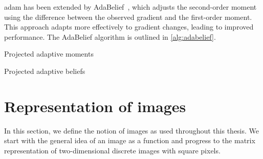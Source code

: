 \Gls{adam} has been extended by AdaBelief~\cite{zhuang2020adabelief}, which adjusts the second-order moment using the difference between the observed gradient and the first-order moment.
This approach adapts more effectively to gradient changes, leading to improved performance.
The AdaBelief algorithm is outlined in \cref{alg:adabelief}.
\begin{algorithm}
	\DontPrintSemicolon
	\caption{Projected adaptive moments~\cite{kingma_adam_2015}}
	\label{alg:adam}
\end{algorithm}
\begin{algorithm}
	\DontPrintSemicolon
	\caption{Projected adaptive beliefs~\cite{zhuang2020adabelief}}
	\label{alg:adabelief}
\end{algorithm}
\section{Representation of images}
In this section, we define the notion of images as used throughout this thesis.
We start with the general idea of an image as a function and progress to the matrix representation of two-dimensional discrete images with square pixels.

